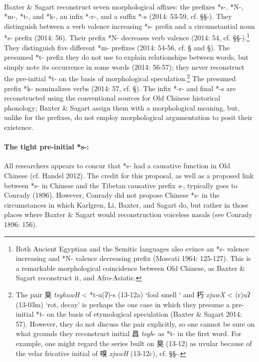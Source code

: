 \paragraph{} 
\label{par:recon-t-p-initials-on-morphological-speculation}
Baxter \& Sagart reconstruct seven morphological affixes: the
prefixes *s-, *N-, *m-, *t-, and *k-, an infix *-r-, and a suffix *-s
(2014: 53-59, cf. §§-). They distinguish between a verb valence
increasing *s- prefix and a circumstantial noun *s- prefix (2014: 56).
Their prefix *N- decreases verb valence (2014: 54, cf. §§-).\footnote{Both
  Ancient Egyptian and the Semitic languages also evince an *s- valence
  increasing and *N- valence decreasing prefix (Moscati 1964: 125-127).
  This is a remarkable morphological coincidence between Old Chinese, as
  Baxter \& Sagart reconstruct it, and Afro-Asiatic. } They distinguish
five different *m- prefixes (2014: 54-56, cf. § and §). The presumed *t-
prefix they do not use to explain relationships between words, but
simply note its occurrence in some words (2014: 56-57); they never
reconstruct the pre-initial *t- on the basis of morphological
speculation.\footnote{The pair 臭  \emph{tsyhuwH} \textless{} *t-{}u(ʔ)-s
  (13-12a) `foul smell ` and 朽  \emph{xjuwX} \textless{} {}(r)uʔ
  (13-03m) `rot, decay' is perhaps the one case in which they presume a
  pre-initial *t- on the basis of etymological speculation (Baxter \&
  Sagart 2014: 57). However, they do not discuss the pair explicitly, so
  one cannot be sure on what grounds they reconstruct initial 昌
   \emph{tsyh}- as *t-{} in the first word. For example, one might regard
  the series built on 臭 (13-12) as uvular because of the velar
  fricative initial of 嗅 \emph{xjuwH} (13-12c), cf. §§-. } The presumed
prefix *k- nominalizes verbs (2014: 57, cf. §). The infix *-r- and final
*-s are reconstructed using the conventional sources for Old Chinese
historical phonology; Baxter \& Sagart assign them with a morphological
meaning, but, unlike for the prefixes, do not employ morphological
argumentation to posit their existence.

\paragraph{The tight pre-initial
*s-:} All researchers appears to concur that *s- had a
causative function in Old Chinese (cf. Handel 2012). The credit for this
proposal, as well as a proposed link between *s- in Chinese and the
Tibetan causative prefix \emph{s}-, typically goes to Conrady (1896).
However, Conrady did not propose Chinese *s- in the circumstances in
which Karlgren, Li, Baxter, and Sagart do, but rather in those places
where Baxter \& Sagart would reconstruction voiceless nasals (see
Conrady 1896: 156).


